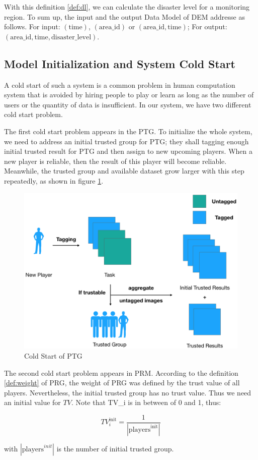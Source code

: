 With this definition \ref{def:dl}, we can calculate the disaster level for a monitoring region.
To sum up, the input and the output Data Model of DEM addresse as follows. For input:
$(\text{time})$, $(\text{area\_id})$ or $(\text{area\_id}, \text{time})$; For output:
$(\text{area\_id}, \text{time}, \text{disaster\_level})$.

\subsection{Model Initialization and System Cold Start}

A cold start of such a system is a common problem in human computation system that 
is avoided by hiring people to play or learn as long as 
the number of users or the quantity of data is insufficient.
In our system, we have two different cold start problem.

The first cold start problem appears in the PTG. To initialize the whole system, we need to
address an initial trusted group for PTG; they shall tagging enough initial trusted result
for PTG and then assign to new upcoming players. When a new player is reliable,
then the result of this player will become reliable. Meanwhile, the trusted group and 
available dataset grow larger with this step repeatedly, as shown in figure \ref{fig:cold}.

\begin{figure}[htp]
\centering
\includegraphics[width=0.5\columnwidth]{figures/coldstart}
\caption{Cold Start of PTG}
\label{fig:cold}
\end{figure}

The second cold start problem appears in PRM. According to the definition \ref{def:weight} of PRG, the weight
of PRG was defined by the trust value of all players. Nevertheless, the initial trusted group has
no trust value. Thus we need an initial value for $TV$. Note that TV\_i is in between of 0 and 1, thus:

\[
TV_{i}^{\text{init}} = \frac{1}{|\text{players}^{\text{init}}|}
\]

with $|\text{players}^{init}|$ is the number of initial trusted group. 